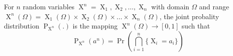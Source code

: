For $n$ random variables $\operatorname{X}^n = \operatorname{X}_1, \operatorname{X}_2, \dots, \operatorname{X}_n$ with domain $\Omega$ and range $\operatorname{X}^n(\Omega) = \operatorname{X}_1(\Omega) \times \operatorname{X}_2(\Omega) \times \dots \times \operatorname{X}_n(\Omega)$, the joint probality distribution $\operatorname{P}_{\operatorname{X}^n}(.)$ is the mapping $\operatorname{X}^n(\Omega) \to [0, 1]$ such that
$$\operatorname{P}_{\operatorname{\operatorname{X}}^n}(a^n) = \operatorname{Pr}(\bigcap\limits_{i=1}^n \{ \operatorname{X}_i = a_i \})$$
